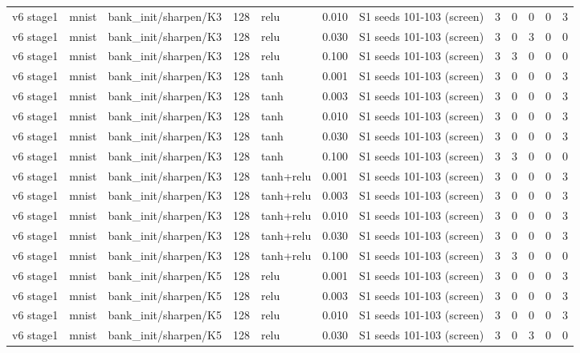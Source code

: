 \begin{table}[htbp]
{\begin{tabular}{@{}lllrlrlrrrrr@{}}
v6 stage1 & mnist & bank\_init/sharpen/K3 & 128 & relu & 0.010 & S1 seeds 101-103 (screen) & 3 & 0 & 0 & 0 & 3 \\
v6 stage1 & mnist & bank\_init/sharpen/K3 & 128 & relu & 0.030 & S1 seeds 101-103 (screen) & 3 & 0 & 3 & 0 & 0 \\
v6 stage1 & mnist & bank\_init/sharpen/K3 & 128 & relu & 0.100 & S1 seeds 101-103 (screen) & 3 & 3 & 0 & 0 & 0 \\
v6 stage1 & mnist & bank\_init/sharpen/K3 & 128 & tanh & 0.001 & S1 seeds 101-103 (screen) & 3 & 0 & 0 & 0 & 3 \\
v6 stage1 & mnist & bank\_init/sharpen/K3 & 128 & tanh & 0.003 & S1 seeds 101-103 (screen) & 3 & 0 & 0 & 0 & 3 \\
v6 stage1 & mnist & bank\_init/sharpen/K3 & 128 & tanh & 0.010 & S1 seeds 101-103 (screen) & 3 & 0 & 0 & 0 & 3 \\
v6 stage1 & mnist & bank\_init/sharpen/K3 & 128 & tanh & 0.030 & S1 seeds 101-103 (screen) & 3 & 0 & 0 & 0 & 3 \\
v6 stage1 & mnist & bank\_init/sharpen/K3 & 128 & tanh & 0.100 & S1 seeds 101-103 (screen) & 3 & 3 & 0 & 0 & 0 \\
v6 stage1 & mnist & bank\_init/sharpen/K3 & 128 & tanh+relu & 0.001 & S1 seeds 101-103 (screen) & 3 & 0 & 0 & 0 & 3 \\
v6 stage1 & mnist & bank\_init/sharpen/K3 & 128 & tanh+relu & 0.003 & S1 seeds 101-103 (screen) & 3 & 0 & 0 & 0 & 3 \\
v6 stage1 & mnist & bank\_init/sharpen/K3 & 128 & tanh+relu & 0.010 & S1 seeds 101-103 (screen) & 3 & 0 & 0 & 0 & 3 \\
v6 stage1 & mnist & bank\_init/sharpen/K3 & 128 & tanh+relu & 0.030 & S1 seeds 101-103 (screen) & 3 & 0 & 0 & 0 & 3 \\
v6 stage1 & mnist & bank\_init/sharpen/K3 & 128 & tanh+relu & 0.100 & S1 seeds 101-103 (screen) & 3 & 3 & 0 & 0 & 0 \\
v6 stage1 & mnist & bank\_init/sharpen/K5 & 128 & relu & 0.001 & S1 seeds 101-103 (screen) & 3 & 0 & 0 & 0 & 3 \\
v6 stage1 & mnist & bank\_init/sharpen/K5 & 128 & relu & 0.003 & S1 seeds 101-103 (screen) & 3 & 0 & 0 & 0 & 3 \\
v6 stage1 & mnist & bank\_init/sharpen/K5 & 128 & relu & 0.010 & S1 seeds 101-103 (screen) & 3 & 0 & 0 & 0 & 3 \\
v6 stage1 & mnist & bank\_init/sharpen/K5 & 128 & relu & 0.030 & S1 seeds 101-103 (screen) & 3 & 0 & 3 & 0 & 0 \\

\end{tabular}}
\end{table}
